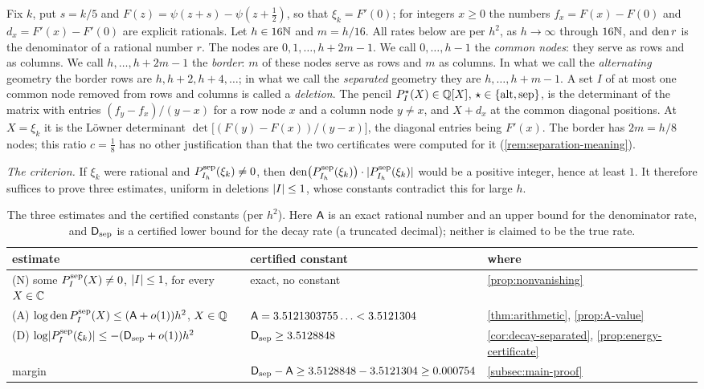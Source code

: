 Fix $k$, put $s=k/5$ and $F(z)=\psi(z+s)-\psi(z+\frac12)$, so that $\xi_k=F'(0)$; for integers
$x\ge0$ the numbers $f_x=F(x)-F(0)$ and $d_x=F'(x)-F'(0)$ are explicit rationals. Let
$h\in16\mathbb{N}$ and $m=h/16$. All rates below are per $h^2$, as $h\to\infty$ through $16\mathbb{N}$, and
$\operatorname{den} r$ is the denominator of a rational number $r$. The nodes are $0,1,\dots,h+2m-1$. We call $0,\dots,h-1$ the
\emph{common nodes}: they serve as rows and as columns. We call $h,\dots,h+2m-1$ the
\emph{border}: $m$ of these nodes serve as rows and $m$ as columns. In what we call the \emph{alternating} geometry the border rows are
$h,h+2,h+4,\dots$; in what we call the \emph{separated} geometry they are $h,\dots,h+m-1$. A
set $I$ of at most one common node removed from rows and columns is called a \emph{deletion}.
The pencil $P^\star_I(X)\in\mathbb{Q}[X]$, $\star\in\{\mathrm{alt},\mathrm{sep}\}$, is the determinant of the matrix with
entries $(f_y-f_x)/(y-x)$ for a row node $x$ and a column node $y\ne x$, and $X+d_x$ at the
common diagonal positions. At $X=\xi_k$ it is the L\"owner determinant
$\det\bigl[(F(y)-F(x))/(y-x)\bigr]$, the diagonal entries being $F'(x)$. The border has $2m=h/8$
nodes; this ratio $c=\frac18$ has no other justification than that the two certificates were
computed for it (\cref{rem:separation-meaning}).

\emph{The criterion.} If $\xi_k$ were rational and $P^{\mathrm{sep}}_{I_h}(\xi_k)\ne0$, then
$\operatorname{den}\bigl(P^{\mathrm{sep}}_{I_h}(\xi_k)\bigr)\cdot\lvert P^{\mathrm{sep}}_{I_h}(\xi_k)\rvert$ would be a positive integer,
hence at least $1$. It therefore suffices to prove three estimates, uniform in deletions
$\lvert I\rvert\le1$, whose constants contradict this for large $h$.

\begin{table}[ht]
\centering
\small
\begin{tabular}{@{}>{\raggedright\arraybackslash}p{}>{\raggedright\arraybackslash}p{}>{\raggedright\arraybackslash}p{}@{}}
\toprule
estimate & certified constant & where\\
\midrule
(N) some $P^{\mathrm{sep}}_{I}(X)\ne0$, $\lvert I\rvert\le1$, for every $X\in\mathbb{C}$ & exact, no constant & \cref{prop:nonvanishing}\\
(A) $\log\operatorname{den} P^{\mathrm{sep}}_I(X)\le(\mathsf{A}+o(1))h^2$, $X\in\mathbb{Q}$ & $\mathsf{A}=3.5121303755\ldots<3.5121304$ & \cref{thm:arithmetic}, \cref{prop:A-value}\\
(D) $\log\lvert P^{\mathrm{sep}}_I(\xi_k)\rvert\le-(\mathsf{D}_{\mathrm{sep}}+o(1))h^2$ & $\mathsf{D}_{\mathrm{sep}}\ge3.5128848$ & \cref{cor:decay-separated}, \cref{prop:energy-certificate}\\
margin & $\mathsf{D}_{\mathrm{sep}}-\mathsf{A}\ge3.5128848-3.5121304\ge0.000754$ & \cref{subsec:main-proof}\\
\bottomrule
\end{tabular}
\caption{The three estimates and the certified constants (per $h^2$). Here $\mathsf{A}$ is an exact
rational number and an upper bound for the denominator rate, and $\mathsf{D}_{\mathrm{sep}}$ is a certified lower
bound for the decay rate (a truncated decimal); neither is claimed to be the true rate.}
\label{tab:constants}
\end{table}

